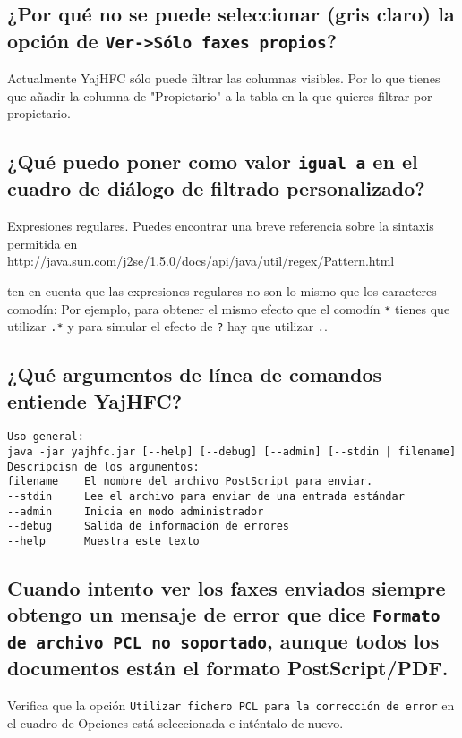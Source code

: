 \documentclass[a4paper,10pt]{scrartcl}
\begin{document}
\subsection{¿Por qué no se puede seleccionar (gris claro) la opción de \texttt{Ver->Sólo faxes propios}?}

Actualmente YajHFC sólo puede filtrar las columnas visibles. Por lo que tienes que añadir la columna de "Propietario" a la tabla en la que quieres filtrar por propietario.


\subsection{¿Qué puedo poner como valor \texttt{igual a} en el cuadro de diálogo de filtrado personalizado? }

Expresiones regulares. Puedes encontrar una breve referencia sobre la sintaxis permitida en
\url{http://java.sun.com/j2se/1.5.0/docs/api/java/util/regex/Pattern.html}

ten en cuenta que las expresiones regulares no son lo mismo que los caracteres comodín:
Por ejemplo, para obtener el mismo efecto que el comodín \verb.*. tienes que utilizar \verb#.*#
y para simular el efecto de \verb#?# hay que utilizar \verb#.#.

\subsection{¿Qué argumentos de línea de comandos entiende YajHFC?}

\begin{verbatim}
Uso general:
java -jar yajhfc.jar [--help] [--debug] [--admin] [--stdin | filename]
Descripcisn de los argumentos:
filename    El nombre del archivo PostScript para enviar.
--stdin     Lee el archivo para enviar de una entrada estándar
--admin     Inicia en modo administrador
--debug     Salida de información de errores
--help      Muestra este texto
\end{verbatim}


\subsection{ Cuando intento ver los faxes enviados siempre obtengo un mensaje de error 
   que dice \texttt{Formato de archivo PCL no soportado}, aunque todos los documentos 
   están el formato PostScript/PDF.}

Verifica que la opción \texttt{Utilizar fichero PCL para la corrección de error} en el 
cuadro de Opciones está seleccionada e inténtalo de nuevo.
 
\end{document}
